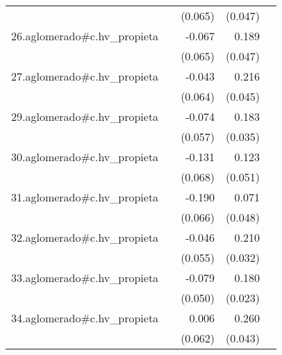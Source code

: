 {\begin{longtable}{l*{4}{D{.}{.}{-1}}}
            &                     &     (0.065)         &     (0.047)         &                     \\
\addlinespace
26.aglomerado#c.hv\_propieta&                     &      -0.067         &       0.189\sym{***}&                     \\
            &                     &     (0.065)         &     (0.047)         &                     \\
\addlinespace
27.aglomerado#c.hv\_propieta&                     &      -0.043         &       0.216\sym{***}&                     \\
            &                     &     (0.064)         &     (0.045)         &                     \\
\addlinespace
29.aglomerado#c.hv\_propieta&                     &      -0.074         &       0.183\sym{***}&                     \\
            &                     &     (0.057)         &     (0.035)         &                     \\
\addlinespace
30.aglomerado#c.hv\_propieta&                     &      -0.131         &       0.123\sym{*}  &                     \\
            &                     &     (0.068)         &     (0.051)         &                     \\
\addlinespace
31.aglomerado#c.hv\_propieta&                     &      -0.190\sym{**} &       0.071         &                     \\
            &                     &     (0.066)         &     (0.048)         &                     \\
\addlinespace
32.aglomerado#c.hv\_propieta&                     &      -0.046         &       0.210\sym{***}&                     \\
            &                     &     (0.055)         &     (0.032)         &                     \\
\addlinespace
33.aglomerado#c.hv\_propieta&                     &      -0.079         &       0.180\sym{***}&                     \\
            &                     &     (0.050)         &     (0.023)         &                     \\
\addlinespace
34.aglomerado#c.hv\_propieta&                     &       0.006         &       0.260\sym{***}&                     \\
            &                     &     (0.062)         &     (0.043)         &                     \\

\end{longtable}}
